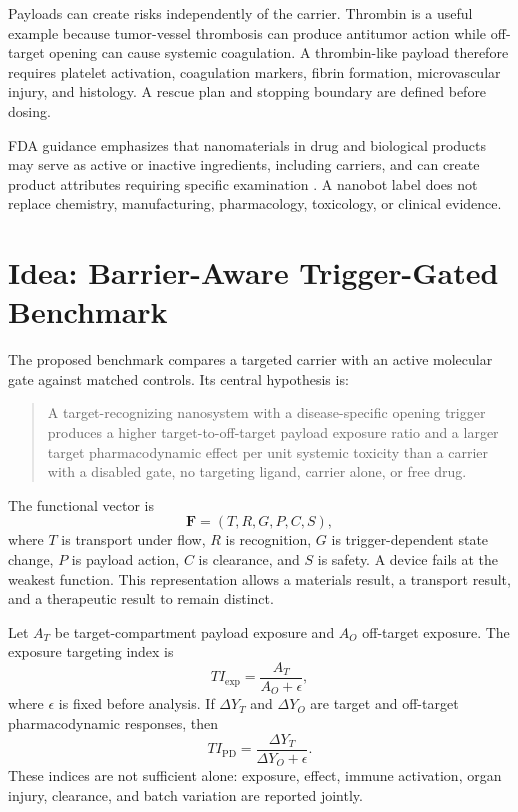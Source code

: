 \documentclass[conference]{IEEEtran}
\begin{document}
Payloads can create risks independently of the carrier. Thrombin is a useful example because tumor-vessel thrombosis can produce antitumor action while off-target opening can cause systemic coagulation. A thrombin-like payload therefore requires platelet activation, coagulation markers, fibrin formation, microvascular injury, and histology. A rescue plan and stopping boundary are defined before dosing.

FDA guidance emphasizes that nanomaterials in drug and biological products may serve as active or inactive ingredients, including carriers, and can create product attributes requiring specific examination \cite{fda2022}. A nanobot label does not replace chemistry, manufacturing, pharmacology, toxicology, or clinical evidence.

\section{Idea: Barrier-Aware Trigger-Gated Benchmark}
\label{sec:idea}
The proposed benchmark compares a targeted carrier with an active molecular gate against matched controls. Its central hypothesis is:

\begin{quote}
A target-recognizing nanosystem with a disease-specific opening trigger produces a higher target-to-off-target payload exposure ratio and a larger target pharmacodynamic effect per unit systemic toxicity than a carrier with a disabled gate, no targeting ligand, carrier alone, or free drug.
\end{quote}

The functional vector is
\begin{equation}
\mathbf{F}=(T,R,G,P,C,S),
\label{eq:function}
\end{equation}
where $T$ is transport under flow, $R$ is recognition, $G$ is trigger-dependent state change, $P$ is payload action, $C$ is clearance, and $S$ is safety. A device fails at the weakest function. This representation allows a materials result, a transport result, and a therapeutic result to remain distinct.

Let $A_T$ be target-compartment payload exposure and $A_O$ off-target exposure. The exposure targeting index is
\begin{equation}
TI_{\mathrm{exp}}=\frac{A_T}{A_O+\epsilon},
\label{eq:tiexp}
\end{equation}
where $\epsilon$ is fixed before analysis. If $\Delta Y_T$ and $\Delta Y_O$ are target and off-target pharmacodynamic responses, then
\begin{equation}
TI_{\mathrm{PD}}=\frac{\Delta Y_T}{\Delta Y_O+\epsilon}.
\label{eq:tipd}
\end{equation}
These indices are not sufficient alone: exposure, effect, immune activation, organ injury, clearance, and batch variation are reported jointly.
\end{document}
